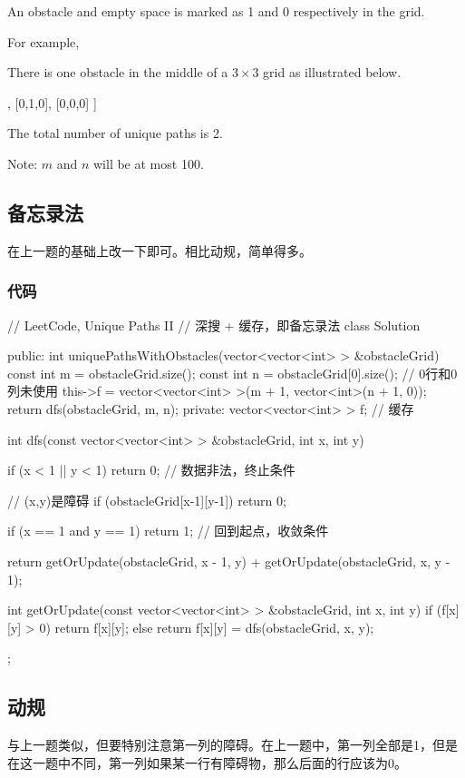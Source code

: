 An obstacle and empty space is marked as 1 and 0 respectively in the grid.

For example,

There is one obstacle in the middle of a $3 \times 3$ grid as illustrated below.
\begin{Code}
[
  [0,0,0],
  [0,1,0],
  [0,0,0]
]
\end{Code}

The total number of unique paths is 2.

Note: $m$ and $n$ will be at most 100.


\subsection{备忘录法}
在上一题的基础上改一下即可。相比动规，简单得多。

\subsubsection{代码}
\begin{Code}
// LeetCode, Unique Paths II
// 深搜 + 缓存，即备忘录法
class Solution {
public:
    int uniquePathsWithObstacles(vector<vector<int> > &obstacleGrid) {
        const int m = obstacleGrid.size();
        const int n = obstacleGrid[0].size();
        // 0行和0列未使用
        this->f = vector<vector<int> >(m + 1, vector<int>(n + 1, 0));
        return dfs(obstacleGrid, m, n);
    }
private:
    vector<vector<int> > f;  // 缓存

    int dfs(const vector<vector<int> > &obstacleGrid,
            int x, int y) {
        if (x < 1 || y < 1) return 0; // 数据非法，终止条件

        // (x,y)是障碍
        if (obstacleGrid[x-1][y-1]) return 0;

        if (x == 1 and y == 1) return 1; // 回到起点，收敛条件

        return getOrUpdate(obstacleGrid, x - 1, y) +
                getOrUpdate(obstacleGrid, x, y - 1);
    }

    int getOrUpdate(const vector<vector<int> > &obstacleGrid,
            int x, int y) {
        if (f[x][y] > 0) return f[x][y];
        else return f[x][y] = dfs(obstacleGrid, x, y);
    }
};
\end{Code}


\subsection{动规}
与上一题类似，但要特别注意第一列的障碍。在上一题中，第一列全部是1，但是在这一题中不同，第一列如果某一行有障碍物，那么后面的行应该为0。


